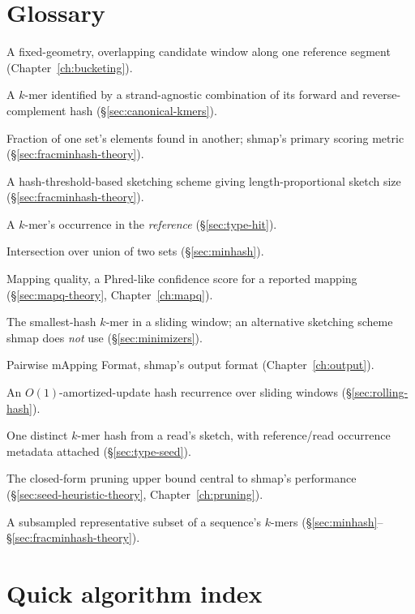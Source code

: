 \section{Glossary}

\begin{description}[style=nextline,leftmargin=1.2cm]
\item[Bucket] A fixed-geometry, overlapping candidate window along one reference segment
  (Chapter~\ref{ch:bucketing}).
\item[Canonical $k$-mer] A $k$-mer identified by a strand-agnostic combination of its forward and
  reverse-complement hash (\S\ref{sec:canonical-kmers}).
\item[Containment index] Fraction of one set's elements found in another; shmap's primary scoring
  metric (\S\ref{sec:fracminhash-theory}).
\item[FracMinHash] A hash-threshold-based sketching scheme giving length-proportional sketch size
  (\S\ref{sec:fracminhash-theory}).
\item[Hit] A $k$-mer's occurrence in the \emph{reference} (\S\ref{sec:type-hit}).
\item[Jaccard similarity] Intersection over union of two sets (\S\ref{sec:minhash}).
\item[MAPQ] Mapping quality, a Phred-like confidence score for a reported mapping
  (\S\ref{sec:mapq-theory}, Chapter~\ref{ch:mapq}).
\item[Minimizer] The smallest-hash $k$-mer in a sliding window; an alternative sketching scheme
  shmap does \emph{not} use (\S\ref{sec:minimizers}).
\item[PAF] Pairwise mApping Format, shmap's output format (Chapter~\ref{ch:output}).
\item[Rolling hash] An $O(1)$-amortized-update hash recurrence over sliding windows
  (\S\ref{sec:rolling-hash}).
\item[Seed] One distinct $k$-mer hash from a read's sketch, with reference/read occurrence
  metadata attached (\S\ref{sec:type-seed}).
\item[Seed heuristic] The closed-form pruning upper bound central to shmap's performance
  (\S\ref{sec:seed-heuristic-theory}, Chapter~\ref{ch:pruning}).
\item[Sketch] A subsampled representative subset of a sequence's $k$-mers
  (\S\ref{sec:minhash}--\S\ref{sec:fracminhash-theory}).
\end{description}

\section{Quick algorithm index}

